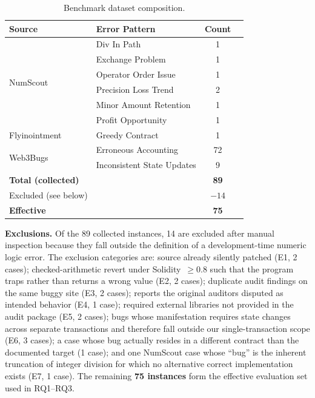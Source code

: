 \documentclass[pdflatex,sn-basic]{sn-jnl}%
\theoremstyle{thmstyleone}%
\theoremstyle{thmstyletwo}%
\theoremstyle{thmstylethree}%
\begin{document}
\begin{table}[t]
\centering
\caption{Benchmark dataset composition.}
\label{tab:dataset}
\begin{tabular}{llcc}
\hline
\textbf{Source} & \textbf{Error Pattern} & \textbf{Count} \\
\hline
\multirow{6}{*}{NumScout}
  & Div In Path              & 1  \\
  & Exchange Problem         & 1  \\
  & Operator Order Issue     & 1  \\
  & Precision Loss Trend     & 2  \\
  & Minor Amount Retention   & 1  \\
  & Profit Opportunity       & 1  \\
\hline
Flyinointment & Greedy Contract & 1 \\
\hline
\multirow{2}{*}{Web3Bugs}
  & Erroneous Accounting        & 72 \\
  & Inconsistent State Updates  & 9  \\
\hline
\textbf{Total (collected)} & & \textbf{89} \\
Excluded (see below)        & & $-14$ \\
\textbf{Effective}          & & \textbf{75} \\
\hline
\end{tabular}
\end{table}

\smallskip\noindent\textbf{Exclusions.}
Of the 89 collected instances, 14 are excluded after manual inspection because they fall outside the definition of a development-time numeric logic error.
The exclusion categories are:
source already silently patched (E1, 2 cases);
checked-arithmetic revert under Solidity~$\geq$0.8 such that the program traps rather than returns a wrong value (E2, 2 cases);
duplicate audit findings on the same buggy site (E3, 2 cases);
reports the original auditors disputed as intended behavior (E4, 1 case);
required external libraries not provided in the audit package (E5, 2 cases);
bugs whose manifestation requires state changes across separate transactions and therefore fall outside our single-transaction scope (E6, 3 cases);
a case whose bug actually resides in a different contract than the documented target (1 case);
and one NumScout case whose ``bug'' is the inherent truncation of integer division for which no alternative correct implementation exists (E7, 1 case).
The remaining \textbf{75 instances} form the effective evaluation set used in RQ1--RQ3.
\end{document}
